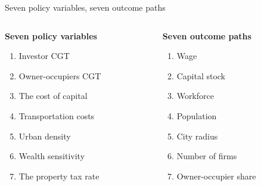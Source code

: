 \documentclass[]{beamer} %
\begin{document}
\begin{frame}{Seven policy variables, seven outcome paths}
\Large
\begin{columns}
    \begin{column}{0.5\textwidth}
        \textbf{Seven policy variables}%
        \begin{enumerate}
        \item Investor CGT
        \item Owner-occupiers CGT
        \item The cost of capital%
        \item Transportation costs%
        \item Urban density%
        \item Wealth sensitivity%
        \item The property tax rate%
    \end{enumerate}
    \end{column}

    \begin{column}{0.5\textwidth}
    \textbf{Seven outcome paths}
    \begin{enumerate}%
       \item Wage \item Capital stock\item
       Workforce   \item Population \item City radius \item  Number of firms \item Owner-occupier share
    \end{enumerate}
    \end{column}
\end{columns}
\vspace{.3cm}
\end{frame}%
\end{document}
